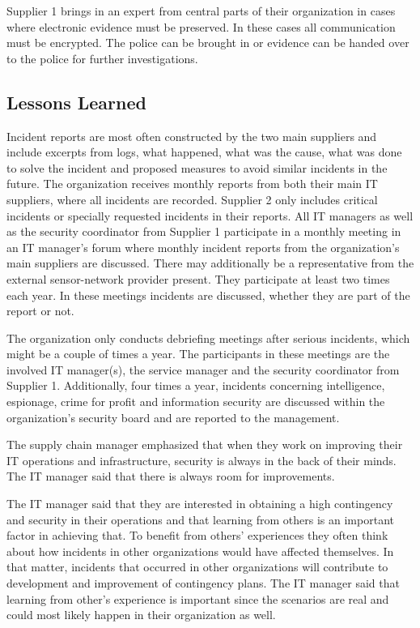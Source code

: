 \documentclass[b5paper, twoside, openright, 11pt]{report}
\begin{document}
Supplier 1 brings in an expert from central parts of their organization in cases where electronic evidence must be preserved. In these cases all communication must be encrypted. The police can be brought in or evidence can be handed over to the police for further investigations.

\subsection{Lessons Learned}
Incident reports are most often constructed by the two main suppliers and include excerpts from logs, what happened, what was the cause, what was done to solve the incident and proposed measures to avoid similar incidents in the future. The organization receives monthly reports from both their main IT suppliers, where all incidents are recorded. Supplier 2 only includes critical incidents or specially requested incidents in their reports. All IT managers as well as the security coordinator from Supplier 1 participate in a monthly meeting in an IT manager's forum where monthly incident reports from the organization's main suppliers are discussed. There may additionally be a representative from the external sensor-network provider present. They participate at least two times each year. In these meetings incidents are discussed, whether they are part of the report or not.

The organization only conducts debriefing meetings after serious incidents, which might be a couple of times a year. The participants in these meetings are the involved IT manager(s), the service manager and the security coordinator from Supplier 1. Additionally, four times a year, incidents concerning intelligence, espionage, crime for profit and information security are discussed within the organization's security board and are reported to the management. 

The supply chain manager emphasized that when they work on improving their IT operations and infrastructure, security is always in the back of their minds. The IT manager said that there is always room for improvements. 

The IT manager said that they are interested in obtaining a high contingency and security in their operations and that learning from others is an important factor in achieving that. To benefit from others' experiences they often think about how incidents in other organizations would have affected themselves. In that matter, incidents that occurred in other organizations will contribute to development and improvement of contingency plans. The IT manager said that learning from other's experience is important since the scenarios are real and could most likely happen in their organization as well.
\end{document}

